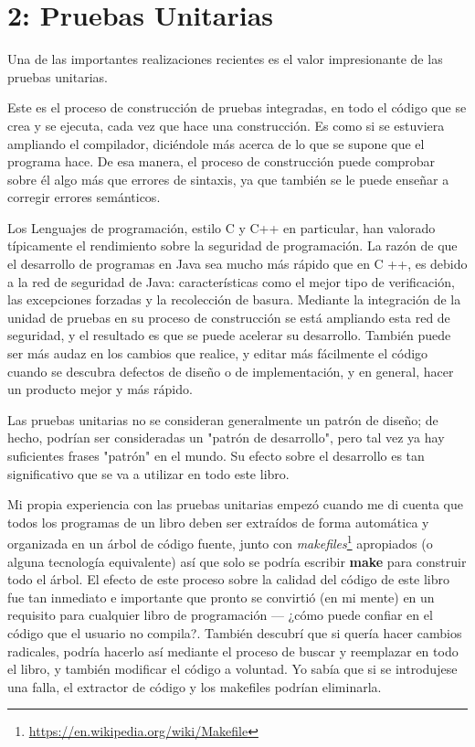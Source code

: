 \section*{2: Pruebas Unitarias}
\label{sec:pu}

\large Una de las  importantes realizaciones recientes es el valor impresionante de las pruebas unitarias.   \newline

Este es el proceso de construcción de pruebas integradas, en todo el código que se crea y se ejecuta, cada vez que hace una construcción.
Es como si se estuviera ampliando el compilador, diciéndole más acerca de lo que se supone que el programa hace. De esa manera, el proceso de construcción puede comprobar sobre él algo más que errores de sintaxis, ya que también se le puede enseñar a corregir errores semánticos. \newline

Los Lenguajes de programación, estilo C y C++ en particular, han valorado típicamente el rendimiento sobre la seguridad de programación. La razón de que el desarrollo de programas en Java sea mucho más rápido que en C ++, es debido a la red de seguridad de Java: características como el mejor tipo de verificación, las excepciones forzadas y la recolección de basura. 
Mediante la integración de la unidad de pruebas en su proceso de construcción se está ampliando esta red de seguridad, y el resultado es que se puede acelerar su desarrollo. También puede ser más audaz en los cambios que realice, y editar más fácilmente el código cuando se descubra defectos de diseño o de implementación, y en general, hacer un producto mejor y más rápido. \newline

Las pruebas unitarias no se consideran generalmente un patrón de diseño; de hecho, podrían ser consideradas un "patrón de desarrollo", pero tal vez ya hay suficientes frases "patrón" en el mundo. 
Su efecto sobre el desarrollo es tan significativo que se va a utilizar en todo este libro.   \newline

Mi propia experiencia con las pruebas unitarias empezó cuando me di cuenta que todos los programas de un libro deben ser extraídos de forma automática y organizada en un árbol de código fuente, junto con \textit{makefiles}\footnote{ \url{https://en.wikipedia.org/wiki/Makefile} } apropiados (o alguna tecnología equivalente) así que solo se podría escribir \textbf{make} para construir todo el árbol.
El efecto de este proceso sobre la calidad del código de este libro fue tan inmediato e importante que pronto se convirtió (en mi mente) en un requisito para cualquier libro de programación — ¿cómo puede confiar en el código que el usuario no compila?. También descubrí que si quería hacer cambios radicales, podría hacerlo así mediante el proceso de buscar y reemplazar en todo el libro, y también modificar el código a voluntad. Yo sabía que si se introdujese una falla, el extractor de código y los makefiles podrían eliminarla.     \newline

